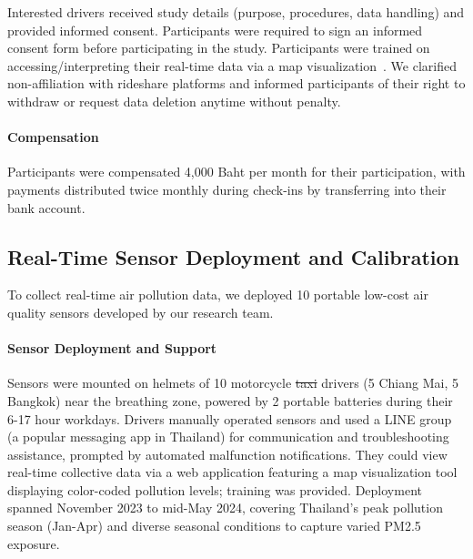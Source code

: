 \documentclass[sigconf,screen,natbib=true]{acmart}
\providecommand{\DIFadd}[1]{{\protect\color{blue}\uwave{#1}}} %
\providecommand{\DIFdel}[1]{{\protect\color{red}\sout{#1}}} %
\providecommand{\DIFaddbegin}{} %
\providecommand{\DIFaddend}{} %
\providecommand{\DIFdelbegin}{} %
\providecommand{\DIFdelend}{} %
\begin{document}
Interested drivers received study details (purpose, procedures, data handling) and provided informed consent.
Participants were required to sign an informed consent form before participating in the study.
Participants were trained on accessing/interpreting their real-time data via a map visualization~\cite{mapvis}.
We clarified non-affiliation with rideshare platforms and informed participants of their right to withdraw or request data deletion anytime without penalty.








\paragraph{Compensation}
Participants were compensated 4,000 Baht per month for their participation, with payments distributed twice monthly during check-ins by transferring into their bank account.

\subsection{Real-Time Sensor Deployment and Calibration}

To collect real-time air pollution data, we deployed 10 portable low-cost air quality sensors developed by our research team.







\paragraph{Sensor Deployment and Support}
Sensors were mounted on helmets of 10 motorcycle \DIFdelbegin \DIFdel{taxi }\DIFdelend \DIFaddbegin \DIFadd{rideshare }\DIFaddend drivers (5 Chiang Mai, 5 Bangkok) near the breathing zone, powered by 2 portable batteries during their 6-17 hour workdays.
Drivers manually operated sensors and used a LINE group (a popular messaging app in Thailand) for communication and troubleshooting assistance, prompted by automated malfunction notifications.
They could view real-time collective data via a web application featuring a map visualization tool~\cite{mapvis} displaying color-coded pollution levels; training was provided.
Deployment spanned November 2023 to mid-May 2024, covering Thailand's peak pollution season (Jan-Apr) and diverse seasonal conditions to capture varied PM2.5 exposure.
\end{document}
